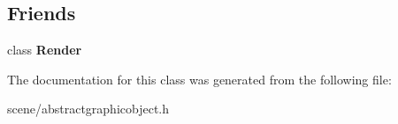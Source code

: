 \subsection*{Friends}
\begin{DoxyCompactItemize}
\item 
\hypertarget{class_tempest_1_1_abstract_graphic_object_ad962652a5ca57a062e87b84d43dad6a3}{class {\bfseries Render}}\label{class_tempest_1_1_abstract_graphic_object_ad962652a5ca57a062e87b84d43dad6a3}

\end{DoxyCompactItemize}


The documentation for this class was generated from the following file\+:\begin{DoxyCompactItemize}
\item 
scene/abstractgraphicobject.\+h\end{DoxyCompactItemize}

